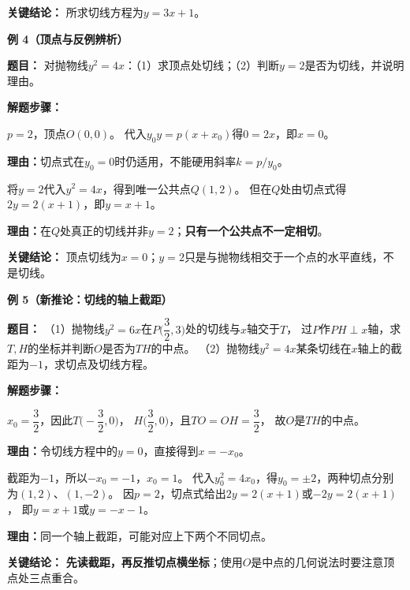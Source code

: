 \begin{examplebox}
	\textbf{\textcolor{CExample}{关键结论：}}
	所求切线方程为$y=3x+1$。

    \medskip
    \textbf{\textcolor{CExample}{例 4（顶点与反例辨析）}}

    \textbf{\textcolor{CExample}{题目：}}
    对抛物线$y^2=4x$：（1）求顶点处切线；（2）判断$y=2$是否为切线，并说明理由。

    \textbf{\textcolor{CExample}{解题步骤：}}
    \begin{description}[style=nextline, leftmargin=2.8em, labelsep=0.5em, itemsep=0.45em]
      \item[\textbf{第一步（顶点切线）：}] $p=2$，顶点$O(0,0)$。
      代入$y_0y=p(x+x_0)$得$0=2x$，即$\boxed{x=0}$。
      \par\textbf{理由：}切点式在$y_0=0$时仍适用，不能硬用斜率$k=p/y_0$。
      \item[\textbf{第二步（检验水平线）：}] 将$y=2$代入$y^2=4x$，得到唯一公共点$Q(1,2)$。
      但在$Q$处由切点式得$2y=2(x+1)$，即$\boxed{y=x+1}$。
      \par\textbf{理由：}在$Q$处真正的切线并非$y=2$；\textbf{只有一个公共点不一定相切}。
    \end{description}

    \textbf{\textcolor{CExample}{关键结论：}}
    顶点切线为$x=0$；$y=2$只是与抛物线相交于一个点的水平直线，不是切线。


    \medskip
    \textbf{\textcolor{CExample}{例 5（新推论：切线的轴上截距）}}

    \textbf{\textcolor{CExample}{题目：}}
    （1）抛物线$y^2=6x$在$P\bigl(\dfrac32,3\bigr)$处的切线与$x$轴交于$T$，
    过$P$作$PH\perp x$轴，求$T,H$的坐标并判断$O$是否为$TH$的中点。
    （2）抛物线$y^2=4x$某条切线在$x$轴上的截距为$-1$，求切点及切线方程。

    \textbf{\textcolor{CExample}{解题步骤：}}
    \begin{description}[style=nextline, leftmargin=2.8em, labelsep=0.5em, itemsep=0.45em]
        \item[\textbf{第一问（截距与中点）：}]
        $x_0=\dfrac32$，因此$T\bigl(-\dfrac32,0\bigr)$，
        $H\bigl(\dfrac32,0\bigr)$，且$TO=OH=\dfrac32$，
        故$O$是$TH$的中点。
        \par\textbf{理由：}令切线方程中的$y=0$，直接得到$x=-x_0$。
        \item[\textbf{第二问（由截距反求切点）：}]
        截距为$-1$，所以$-x_0=-1$，$x_0=1$。
        代入$y_0^2=4x_0$，得$y_0=\pm2$，两种切点分别为$(1,2)$、$(1,-2)$。
        因$p=2$，切点式给出$2y=2(x+1)$或$-2y=2(x+1)$，
        即$\boxed{y=x+1}$或$\boxed{y=-x-1}$。
        \par\textbf{理由：}同一个轴上截距，可能对应上下两个不同切点。
    \end{description}

    \textbf{\textcolor{CExample}{关键结论：}}
    \textbf{先读截距，再反推切点横坐标}；使用$O$是中点的几何说法时要注意顶点处三点重合。
\end{examplebox}
